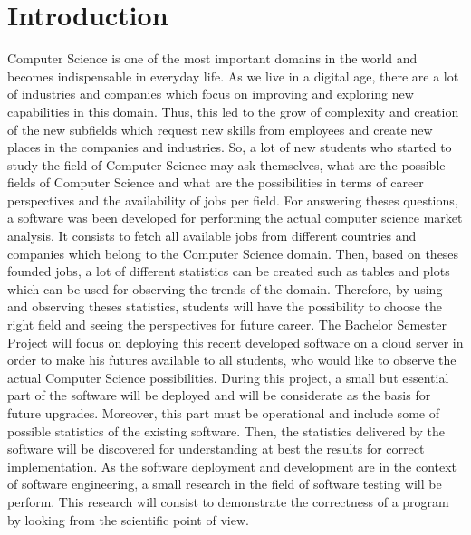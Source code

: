 \documentclass[conference,compsoc]{IEEEtran}
\begin{document}
\section{Introduction}
Computer Science is one of the most important domains in the world and becomes indispensable in everyday life. As we live in a digital age, there are a lot of industries and companies which focus on improving and exploring new capabilities in this domain. Thus, this led to the grow of complexity and creation of the new subfields which request new skills from employees and create new places in the companies and industries.  
\newline\newline                                                                                                                                       
So, a lot of new students who started to study the field of Computer Science may ask themselves, what are the possible fields of Computer Science and what are the possibilities in terms of career perspectives and the availability of jobs per field.
\newline
For answering theses questions, a software was been developed for performing the actual computer science market analysis. It consists to fetch all available jobs from different countries and companies which belong to the Computer Science domain. Then, based on theses founded jobs, a lot of different statistics can be created such as tables and plots which can be used for observing the trends of the domain. Therefore, by using and observing theses statistics, students will have the possibility to choose the right field and seeing the perspectives for future career. 
\newline\newline                                                                  
The Bachelor Semester Project will focus on deploying this recent developed software on a cloud server in order to make his futures available to all students, who would like to observe the actual Computer Science possibilities.                     
\newline                                                                                                              
During this project, a small but essential part of the software will be deployed and will be considerate as the basis for future upgrades. Moreover, this part must be operational and include some of possible statistics of the existing software. Then, the statistics delivered by the software will be discovered for understanding at best the results for correct implementation.    
\newline                                                      
As the software deployment and development are in the context of software engineering, a small research in the field of software testing will be perform. This research will consist to demonstrate the correctness of a program by looking from the scientific point of view. 
\end{document}
